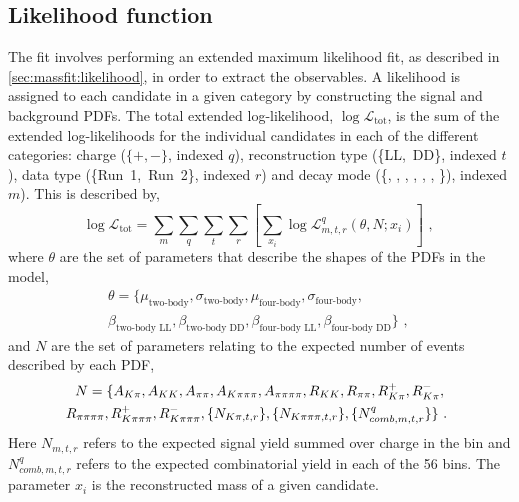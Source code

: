 \begin{table}[h]
\centering
{}
\caption{Summary of the veto efficiencies used in the \CP fit.}
\label{vetoeff}
\end{table}


\subsection{Likelihood function}
\label{sec:cpfit:likelihood}

The \CP fit involves performing an extended maximum likelihood fit, as described in \sect\ref{sec:massfit:likelihood}, in order to extract the \CP observables. A likelihood is assigned to each candidate in a given category by constructing the signal and background PDFs. The total extended log-likelihood, $\log\mathcal{L}_{\text{tot}}$, is the sum of the extended log-likelihoods for the individual candidates in each of the different categories: \B charge (\mbox{$\{+,-\}$}, indexed $q$), \KS reconstruction type (\mbox{\{LL, DD\}}, indexed $t$), data type (\mbox{\{Run 1, Run 2\}}, indexed $r$) and \Dz decay mode (\{\Km\pip, \Km\Kp, \pim\pip, \pim\Kp, \Km\pip\pim\pip, \pim\pip\pim\pip, \pim\Kp\pim\pip\}), indexed $m$). This is described by,
\begin{equation}
\log\mathcal{L}_{\text{tot}} =  \sum_{m}\sum_{q}\sum_{t}\sum_{r}\left[\sum_{x_i} \log{\mathcal{L}}_{m,t,r}^q\left( \theta, N; x_i \right) \right] \text{ , }
\end{equation}
where $\theta$ are the set of parameters that describe the shapes of the PDFs in the model,
\begin{multline}
\theta = \{\mu_\text{two-body}, \sigma_\text{two-body}, \mu_\text{four-body}, \sigma_\text{four-body}, \\ \beta_\text{two-body LL}, \beta_\text{two-body DD}, \beta_\text{four-body LL}, \beta_\text{four-body DD}\} \text{ , }
\end{multline} 
and $N$ are the set of parameters relating to the expected number of events described by each PDF, 
\begin{multline}
N = \{A_{K\pi}, A_{KK}, A_{\pi\pi}, A_{K\pi\pi\pi}, A_{\pi\pi\pi\pi}, R_{KK}, R_{\pi\pi}, R^+_{K\pi}, R^-_{K\pi}, \\ R_{\pi\pi\pi\pi}, R^+_{K\pi\pi\pi}, R^-_{K\pi\pi\pi}, \{N_{K\pi,t,r}\}, \{N_{K\pi\pi\pi,t,r}\}, \{N_{comb,m,t,r}^{q}\}\} \text{ . }
\end{multline}
Here $N_{m,t,r}$ refers to the expected signal yield summed over charge in the bin and $N_{comb,m,t,r}^q$ refers to the expected combinatorial yield in each of the 56 bins. The parameter $x_i$ is  the reconstructed mass of a given candidate.

